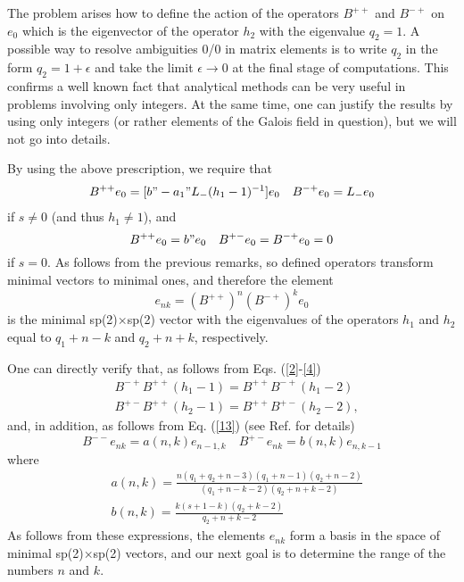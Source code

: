\documentclass[a4paper,12pt]{article}%
\begin{document}
The problem arises how to define the action of the operators 
$B^{++}$ and $B^{-+}$ on $e_0$ which is the 
eigenvector of the operator $h_2$ with the eigenvalue $q_2=1$.
A possible way to resolve ambiguities 0/0 in matrix elements 
is to write $q_2$ in the form $q_2=1+\epsilon$ and take the 
limit $\epsilon\rightarrow 0$ at the
final stage of computations. This confirms a well known fact that
analytical methods can be very useful in problems involving only
integers. At the same time, one can justify the results
by using only integers (or rather elements of the Galois field
in question), but we will not go into details. 

By using the above prescription, we require that
\begin{eqnarray}
B^{++}e_0=[b"-a_1"L_-(h_1-1)^{-1}]e_0\quad B^{-+}e_0=L_-e_0
\label{14}
\end{eqnarray}
if $s\neq 0$ (and thus $h_1\neq 1$), and
\begin{equation}
B^{++}e_0=b"e_0\quad B^{+-}e_0=B^{-+}e_0=0
\label{15}
\end{equation}
if $s=0$. As follows from the previous remarks, so defined operators
transform minimal vectors to minimal ones, and therefore the element
\begin{equation}
e_{nk}=(B^{++})^n(B^{-+})^ke_0
\label{16}
\end{equation}
is the minimal sp(2)$\times$sp(2) vector with the 
eigenvalues of the operators $h_1$ and $h_2$ equal to 
$q_1+n-k$ and $q_2+n+k$, respectively.

One can directly verify that, as follows from Eqs. 
(\ref{2}-\ref{4})
\begin{eqnarray}
&B^{-+}B^{++}(h_1-1)=B^{++}B^{-+}(h_1-2)\nonumber\\
&B^{+-}B^{++}(h_2-1)=B^{++}B^{+-}(h_2-2),
\label{17}
\end{eqnarray}
and, in addition, as follows from Eq. (\ref{13}) (see
Ref. \cite{lev2} for details)
\begin{equation}
B^{--}e_{nk}=a(n,k)e_{n-1,k}\quad 
B^{+-}e_{nk}=b(n,k)e_{n,k-1}
\label{18}
\end{equation}
where
\begin{eqnarray}
&a(n,k)=\frac{n(q_1+q_2+n-3)(q_1+n-1)(q_2+n-2)}
{(q_1+n-k-2)(q_2+n+k-2)}\nonumber\\
&b(n,k)=\frac{k(s+1-k)(q_2+k-2)}{q_2+n+k-2}
\label{19}
\end{eqnarray}
As follows from these expressions, the elements $e_{nk}$ form
a basis in the space of minimal sp(2)$\times$sp(2) vectors,
and our next goal is to determine the range of the numbers $n$
and $k$.
\end{document}
